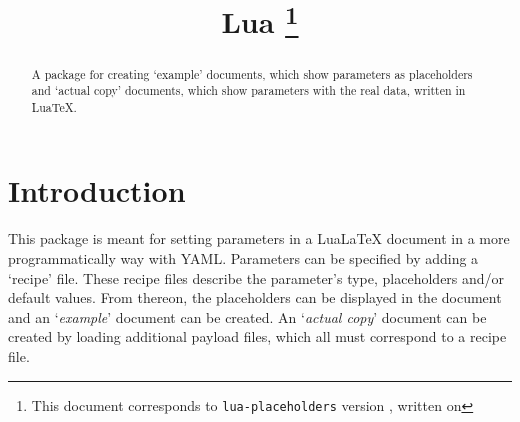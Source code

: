 \documentclass{ltxdoc}
\begin{document}
    \title{Lua \thanks{This document corresponds to \texttt{lua-placeholders} version \gitversion, written on \gitdate}}
    \maketitle
    \begin{abstract}
        A package for creating `example' documents, which show parameters as placeholders and `actual copy' documents, which show parameters with the real data, written in Lua\TeX{}.
    \end{abstract}

    \tableofcontents

    \clearpage

    \section{Introduction}
    This package is meant for setting parameters in a Lua\LaTeX{} document in a more programmatically way with YAML\@.
    Parameters can be specified by adding a `recipe' file.
    These recipe files describe the parameter's type, placeholders and/or default values.
    From thereon, the placeholders can be displayed in the document and an `\textit{example}' document can be created.
    An `\textit{actual copy}' document can be created by loading additional payload files, which all must correspond to a recipe file.
\end{document}

